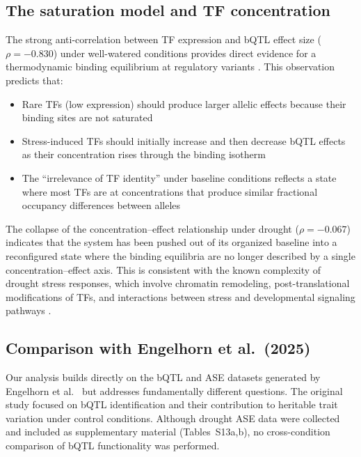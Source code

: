 \documentclass[10pt,letterpaper]{article}
\begin{document}
\subsection*{The saturation model and TF concentration}

The strong anti-correlation between TF expression and bQTL effect size
($\rho = -0.830$) under well-watered conditions provides direct evidence for
a thermodynamic binding equilibrium at regulatory variants
\cite{segal2008,levo2012}. This observation predicts that:

\begin{itemize}
  \item Rare TFs (low expression) should produce larger allelic effects
    because their binding sites are not saturated
  \item Stress-induced TFs should initially increase and then decrease bQTL
    effects as their concentration rises through the binding isotherm
  \item The ``irrelevance of TF identity'' under baseline conditions reflects
    a state where most TFs are at concentrations that produce similar
    fractional occupancy differences between alleles
\end{itemize}

The collapse of the concentration--effect relationship under drought
($\rho = -0.067$) indicates that the system has been pushed out of its
organized baseline into a reconfigured state where the binding equilibria
are no longer described by a single concentration--effect axis. This is
consistent with the known complexity of drought stress responses, which
involve chromatin remodeling, post-translational modifications of TFs, and
interactions between stress and developmental signaling pathways
\cite{kim2017,deng2022}.

\subsection*{Comparison with Engelhorn et al.\ (2025)}

Our analysis builds directly on the bQTL and ASE datasets generated by
Engelhorn et al.\ \cite{engelhorn2025} but addresses fundamentally different
questions. The original study focused on bQTL identification and their
contribution to heritable trait variation under control conditions. Although
drought ASE data were collected and included as supplementary material
(Tables~S13a,b), no cross-condition comparison of bQTL functionality was
performed.
\end{document}
